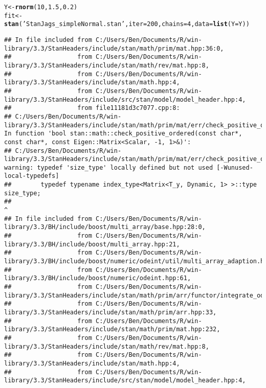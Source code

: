 \documentclass{book}\usepackage[]{graphicx}\usepackage[]{color}
\makeatletter
\newcommand{\hlnum}[1]{\textcolor[rgb]{0.686,0.059,0.569}{#1}}%
\newcommand{\hlstr}[1]{\textcolor[rgb]{0.192,0.494,0.8}{#1}}%
\newcommand{\hlstd}[1]{\textcolor[rgb]{0.345,0.345,0.345}{#1}}%
\newcommand{\hlkwb}[1]{\textcolor[rgb]{0.69,0.353,0.396}{#1}}%
\newcommand{\hlkwc}[1]{\textcolor[rgb]{0.333,0.667,0.333}{#1}}%
\newcommand{\hlkwd}[1]{\textcolor[rgb]{0.737,0.353,0.396}{\textbf{#1}}}%
\newenvironment{kframe}{%
 \def\at@end@of@kframe{}%
 \ifinner\ifhmode%
  \def\at@end@of@kframe{\end{minipage}}%
  \begin{minipage}{\columnwidth}%
 \fi\fi%
 \def\FrameCommand##1{\hskip\@totalleftmargin \hskip-\fboxsep
 \colorbox{shadecolor}{##1}\hskip-\fboxsep
     \hskip-\linewidth \hskip-\@totalleftmargin \hskip\columnwidth}%
 \MakeFramed {\advance\hsize-\width
   \@totalleftmargin\z@ \linewidth\hsize
   \@setminipage}}%
 {\par\unskip\endMakeFramed%
 \at@end@of@kframe}
\newenvironment{knitrout}{}{} %
\makeatother
\begin{document}
\begin{knitrout}
\begin{kframe}
\begin{alltt}
\hlstd{Y} \hlkwb{<-} \hlkwd{rnorm}\hlstd{(}\hlnum{10}\hlstd{,}\hlnum{1.5}\hlstd{,}\hlnum{0.2}\hlstd{)}
\hlstd{fit} \hlkwb{<-} \hlkwd{stan}\hlstd{(}\hlstr{'StanJags_simpleNormal.stan'}\hlstd{,}\hlkwc{iter}\hlstd{=}\hlnum{200}\hlstd{,}\hlkwc{chains}\hlstd{=}\hlnum{4}\hlstd{,}\hlkwc{data}\hlstd{=}\hlkwd{list}\hlstd{(}\hlkwc{Y}\hlstd{=Y))}
\end{alltt}
\begin{verbatim}
## In file included from C:/Users/Ben/Documents/R/win-library/3.3/StanHeaders/include/stan/math/prim/mat.hpp:36:0,
##                  from C:/Users/Ben/Documents/R/win-library/3.3/StanHeaders/include/stan/math/rev/mat.hpp:8,
##                  from C:/Users/Ben/Documents/R/win-library/3.3/StanHeaders/include/stan/math.hpp:4,
##                  from C:/Users/Ben/Documents/R/win-library/3.3/StanHeaders/include/src/stan/model/model_header.hpp:4,
##                  from file11181d3c7077.cpp:8:
## C:/Users/Ben/Documents/R/win-library/3.3/StanHeaders/include/stan/math/prim/mat/err/check_positive_ordered.hpp: In function 'bool stan::math::check_positive_ordered(const char*, const char*, const Eigen::Matrix<Scalar, -1, 1>&)':
## C:/Users/Ben/Documents/R/win-library/3.3/StanHeaders/include/stan/math/prim/mat/err/check_positive_ordered.hpp:39:67: warning: typedef 'size_type' locally defined but not used [-Wunused-local-typedefs]
##        typedef typename index_type<Matrix<T_y, Dynamic, 1> >::type size_type;
##                                                                    ^
## In file included from C:/Users/Ben/Documents/R/win-library/3.3/BH/include/boost/multi_array/base.hpp:28:0,
##                  from C:/Users/Ben/Documents/R/win-library/3.3/BH/include/boost/multi_array.hpp:21,
##                  from C:/Users/Ben/Documents/R/win-library/3.3/BH/include/boost/numeric/odeint/util/multi_array_adaption.hpp:29,
##                  from C:/Users/Ben/Documents/R/win-library/3.3/BH/include/boost/numeric/odeint.hpp:61,
##                  from C:/Users/Ben/Documents/R/win-library/3.3/StanHeaders/include/stan/math/prim/arr/functor/integrate_ode_rk45.hpp:13,
##                  from C:/Users/Ben/Documents/R/win-library/3.3/StanHeaders/include/stan/math/prim/arr.hpp:33,
##                  from C:/Users/Ben/Documents/R/win-library/3.3/StanHeaders/include/stan/math/prim/mat.hpp:232,
##                  from C:/Users/Ben/Documents/R/win-library/3.3/StanHeaders/include/stan/math/rev/mat.hpp:8,
##                  from C:/Users/Ben/Documents/R/win-library/3.3/StanHeaders/include/stan/math.hpp:4,
##                  from C:/Users/Ben/Documents/R/win-library/3.3/StanHeaders/include/src/stan/model/model_header.hpp:4,

\end{verbatim}
\end{kframe}
\end{knitrout}
\end{document}
